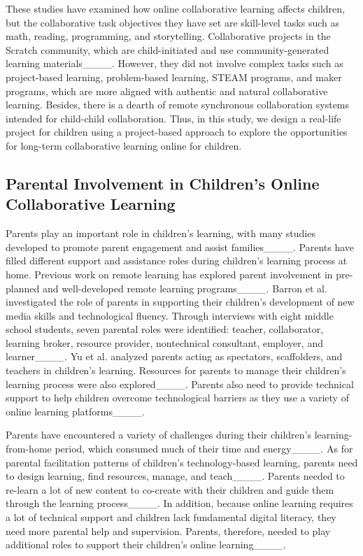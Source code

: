 These studies have examined how online collaborative learning affects children, but the collaborative task objectives they have set are skill-level tasks such as math, reading, programming, and storytelling. Collaborative projects in the Scratch community, which are child-initiated and use community-generated learning materials____. However, they did not involve complex tasks such as project-based learning, problem-based learning, STEAM programs, and maker programs, which are more aligned with authentic and natural collaborative learning. Besides, there is a dearth of remote synchronous collaboration systems intended for child-child collaboration. Thus, in this study, we design a real-life project for children using a project-based approach to explore the opportunities for long-term collaborative learning online for children.

\subsection{Parental Involvement in Children's Online Collaborative Learning}

Parents play an important role in children's learning, with many studies developed to promote parent engagement and assist families____. Parents have filled different support and assistance roles during children's learning process at home. Previous work on remote learning has explored parent involvement in pre-planned and well-developed remote learning programs____. Barron et al. investigated the role of parents in supporting their children's development of new media skills and technological fluency. Through interviews with eight middle school students, seven parental roles were identified: teacher, collaborator, learning broker, resource provider, nontechnical consultant, employer, and learner____. Yu et al. analyzed parents acting as spectators, scaffolders, and teachers in children's learning. Resources for parents to manage their children's learning process were also explored____. Parents also need to provide technical support to help children overcome technological barriers as they use a variety of online learning platforms____.

Parents have encountered a variety of challenges during their children's learning-from-home period, which consumed much of their time and energy____. As for parental facilitation patterns of children’s technology-based learning, parents need to design learning, find resources, manage, and teach____. Parents needed to re-learn a lot of new content to co-create with their children and guide them through the learning process____. In addition, because online learning requires a lot of technical support and children lack fundamental digital literacy, they need more parental help and supervision. Parents, therefore, needed to play additional roles to support their children's online learning____.

